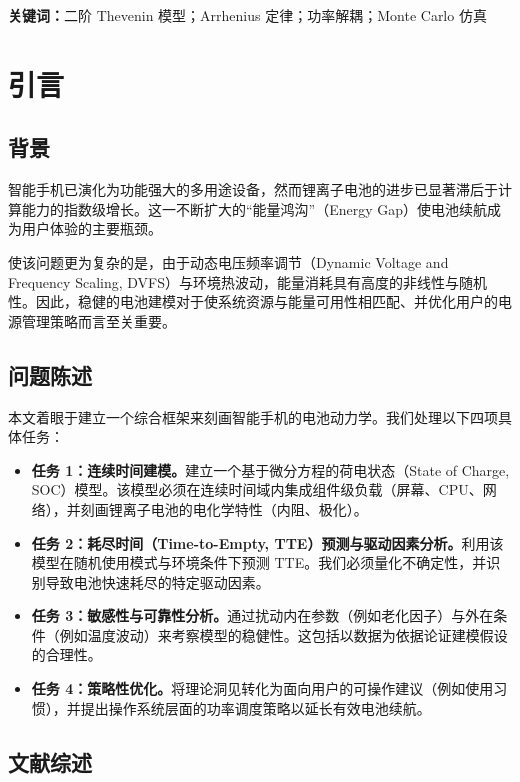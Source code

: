 \documentclass[11pt,a4paper]{ctexart}
\begin{document}
\noindent\textbf{关键词：}二阶 Thevenin 模型；Arrhenius 定律；功率解耦；Monte Carlo 仿真

\newpage

\section{引言}

\subsection{背景}

智能手机已演化为功能强大的多用途设备，然而锂离子电池的进步已显著滞后于计算能力的指数级增长。这一不断扩大的“能量鸿沟”（Energy Gap）使电池续航成为用户体验的主要瓶颈。

使该问题更为复杂的是，由于动态电压频率调节（Dynamic Voltage and Frequency Scaling, DVFS）与环境热波动，能量消耗具有高度的非线性与随机性。因此，稳健的电池建模对于使系统资源与能量可用性相匹配、并优化用户的电源管理策略而言至关重要。

\subsection{问题陈述}

本文着眼于建立一个综合框架来刻画智能手机的电池动力学。我们处理以下四项具体任务：

\begin{itemize}[leftmargin=1.6em,itemsep=0.2em]
\item \textbf{任务 1：连续时间建模。}建立一个基于微分方程的荷电状态（State of Charge, SOC）模型。该模型必须在连续时间域内集成组件级负载（屏幕、CPU、网络），并刻画锂离子电池的电化学特性（内阻、极化）。
\item \textbf{任务 2：耗尽时间（Time-to-Empty, TTE）预测与驱动因素分析。}利用该模型在随机使用模式与环境条件下预测 TTE。我们必须量化不确定性，并识别导致电池快速耗尽的特定驱动因素。
\item \textbf{任务 3：敏感性与可靠性分析。}通过扰动内在参数（例如老化因子）与外在条件（例如温度波动）来考察模型的稳健性。这包括以数据为依据论证建模假设的合理性。
\item \textbf{任务 4：策略性优化。}将理论洞见转化为面向用户的可操作建议（例如使用习惯），并提出操作系统层面的功率调度策略以延长有效电池续航。
\end{itemize}

\subsection{文献综述}
\end{document}
